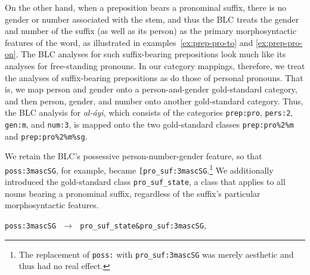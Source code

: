 \begin{description}
On the other hand, when a preposition bears a pronominal suffix, there is no gender 
or number associated with the stem, and thus the BLC treats the gender and 
number of the suffix (as well as its person) 
as the primary morphosyntactic features of the word, as illustrated in 
examples~\ref{ex:prep-pro-to} 
and \ref{ex:prep-pro-on}. The BLC analyses for such suffix-bearing 
prepositions look much 
like its analyses for free-standing pronouns. 
In our category mappings, therefore, we treat the analyses of suffix-bearing 
prepositions as do those 
of personal pronouns. That is, we map person and gender onto a person-and-gender gold-standard
category, and then person, gender, and number onto another gold-standard category.
Thus, the BLC analysis for \textit{al-\'{a}yi}, 
which consists of the categories \texttt{prep:pro}, \texttt{pers:2}, \texttt{gen:m}, and \texttt{num:3}, 
is mapped onto the two gold-standard classes \texttt{prep:pro\%2\%m} and 
\texttt{prep:pro\%2\%m\%sg}.

We retain the BLC's possessive person-number-gender feature, so that \texttt{poss:3mascSG},
for example, became \texttt{[pro\_suf:3mascSG}.\footnote{The replacement of \texttt{poss:} with 
\texttt{pro\_suf:3mascSG} was merely aesthetic and thus had no real effect.}
We additionally introduced the gold-standard class \texttt{pro\_suf\_state}, a class that applies to
all nouns bearing a pronominal suffix, regardless of the suffix's particular
morphosyntactic features. 
\begin{exe}
\ex \label{ex:mapping-pron-suf}
\texttt{poss:3mascSG}  $\,\,\to\,\,$ \texttt{pro\_suf\_state\&pro\_suf:3mascSG}, 
\end{exe}

%
%




\end{description}
